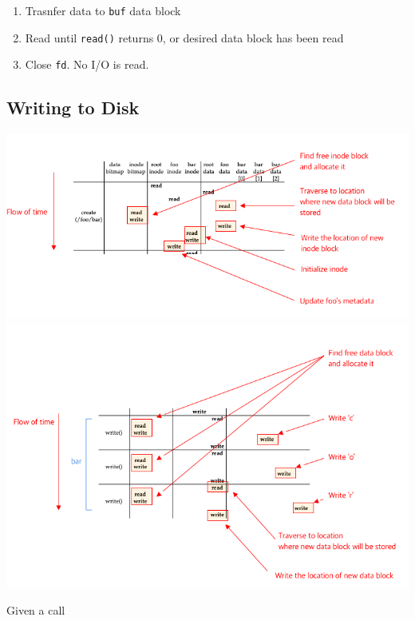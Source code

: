 \documentclass[12pt]{article}
\begin{document}
\begin{itemize}
\begin{enumerate}[1.]
        \item Trasnfer data to \texttt{buf} data block

        \item Read until \texttt{read()} returns 0, or desired data block has been read
        \item Close \texttt{fd}. No I/O is read.
    \end{enumerate}
\end{itemize}

\subsection{Writing to Disk}

\begin{center}
\includegraphics[width=\linewidth]{../images/midterm_4_solution_30.png}
\includegraphics[width=\linewidth]{../images/midterm_4_solution_31.png}
\end{center}

\bigskip

Given a call

\bigskip
\end{document}
